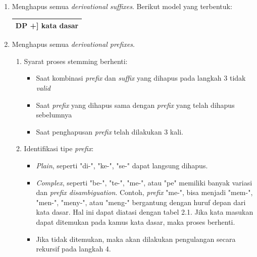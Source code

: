 \begin{enumerate}[leftmargin=*]
\begin{table}[H]
		\hspace{12pt}
	\end{table}
	\item Menghapus semua \textit{derivational suffixes}. Berikut model yang terbentuk:
	\begin{table}[H]
		\hspace{12pt}
		\centering	
		\small
		\begin{adjustbox}{width=1\linewidth}
		\begin{tabular}{|>{\centering\arraybackslash}p{\linewidth}|}
			\hline
			[ [ DP +][ DP +] DP +] kata dasar\\
			\hline
		\end{tabular}
		\end{adjustbox}
		\hspace{12pt}
	\end{table}
	\vspace{-0.7cm}
	\item Menghapus semua \textit{derivational prefixes}.
	\begin{enumerate}[label={\arabic*},leftmargin=*]
		\item Syarat proses stemming berhenti:
		\begin{itemize}[label={-},leftmargin=*]
			\item Saat kombinasi \textit{prefix }dan \textit{suffix }yang 
			dihapus pada langkah 3 tidak \textit{valid}
			\item Saat \textit{prefix} yang dihapus sama dengan \textit{prefix} 
			yang telah dihapus sebelumnya
			\item Saat penghapusan \textit{prefix }telah dilakukan 3 kali.
		\end{itemize}
		\item Identifikasi tipe \textit{prefix}:
			\begin{itemize}[label={-},leftmargin=*]
				\item \textit{Plain}, seperti "di-", "ke-", "se-" dapat langsung dihapus.
				\item \textit{Complex}, seperti "be-", "te-", "me-", atau 
				"pe" memiliki banyak variasi dan \textit{prefix disambiguation}. 
				Contoh, \textit{prefix }"me-", bisa menjadi "mem-", 
				"men-", "meny-", atau "meng-" bergantung dengan huruf depan	dari kata dasar. Hal ini dapat diatasi dengan tabel 2.1. Jika kata masukan dapat ditemukan pada kamus kata dasar, maka proses berhenti.
				\item Jika tidak ditemukan, maka akan dilakukan pengulangan secara rekursif pada langkah 4.
			\end{itemize}

\end{enumerate}
\end{enumerate}
